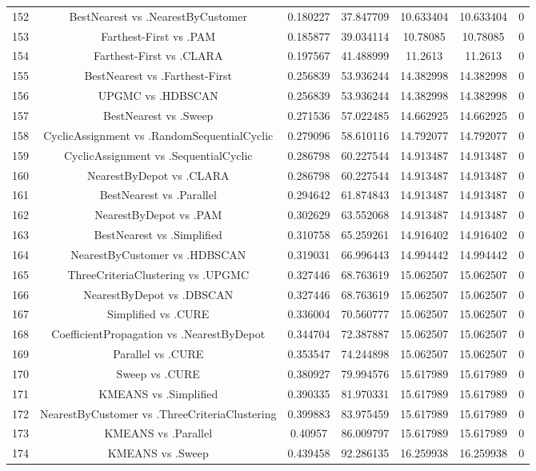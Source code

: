 \documentclass[a4paper,10pt]{article}
\begin{document}
\begin{landscape}
\begin{table}[!htp]
\begin{tabular}{ccccccc}
152&BestNearest vs .NearestByCustomer&0.180227&37.847709&10.633404&10.633404&0\\
153&Farthest-First vs .PAM&0.185877&39.034114&10.78085&10.78085&0\\
154&Farthest-First vs .CLARA&0.197567&41.488999&11.2613&11.2613&0\\
155&BestNearest vs .Farthest-First&0.256839&53.936244&14.382998&14.382998&0\\
156&UPGMC vs .HDBSCAN&0.256839&53.936244&14.382998&14.382998&0\\
157&BestNearest vs .Sweep&0.271536&57.022485&14.662925&14.662925&0\\
158&CyclicAssignment vs .RandomSequentialCyclic&0.279096&58.610116&14.792077&14.792077&0\\
159&CyclicAssignment vs .SequentialCyclic&0.286798&60.227544&14.913487&14.913487&0\\
160&NearestByDepot vs .CLARA&0.286798&60.227544&14.913487&14.913487&0\\
161&BestNearest vs .Parallel&0.294642&61.874843&14.913487&14.913487&0\\
162&NearestByDepot vs .PAM&0.302629&63.552068&14.913487&14.913487&0\\
163&BestNearest vs .Simplified&0.310758&65.259261&14.916402&14.916402&0\\
164&NearestByCustomer vs .HDBSCAN&0.319031&66.996443&14.994442&14.994442&0\\
165&ThreeCriteriaClustering vs .UPGMC&0.327446&68.763619&15.062507&15.062507&0\\
166&NearestByDepot vs .DBSCAN&0.327446&68.763619&15.062507&15.062507&0\\
167&Simplified vs .CURE&0.336004&70.560777&15.062507&15.062507&0\\
168&CoefficientPropagation vs .NearestByDepot&0.344704&72.387887&15.062507&15.062507&0\\
169&Parallel vs .CURE&0.353547&74.244898&15.062507&15.062507&0\\
170&Sweep vs .CURE&0.380927&79.994576&15.617989&15.617989&0\\
171&KMEANS vs .Simplified&0.390335&81.970331&15.617989&15.617989&0\\
172&NearestByCustomer vs .ThreeCriteriaClustering&0.399883&83.975459&15.617989&15.617989&0\\
173&KMEANS vs .Parallel&0.40957&86.009797&15.617989&15.617989&0\\
174&KMEANS vs .Sweep&0.439458&92.286135&16.259938&16.259938&0\\

\end{tabular}
\end{table}
\end{landscape}
\end{document}
